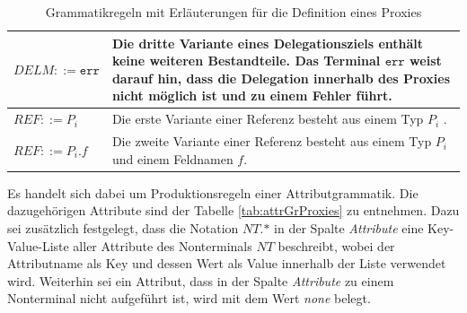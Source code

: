 \documentclass[a4paper,12pt]{article}
\begin{document}
\begin{table}[H]
\begin{tabular}{|p{5cm}|p{9cm}|}
\hline
$\mathit{DELM} ::= \texttt{err} $  
& Die dritte Variante eines Delegationsziels enthält keine weiteren Bestandteile. Das Terminal $\texttt{err}$ weist darauf hin, dass die Delegation innerhalb des Proxies nicht möglich ist und zu einem Fehler führt.\\
\hline
$\mathit{REF} ::= \mathit{P_i}$
& Die erste Variante einer Referenz besteht aus einem Typ $P_i$ .\\
\hline
$\mathit{REF} ::= \mathit{P_i}\texttt{.}\mathit{f}$
& Die zweite Variante einer Referenz besteht aus einem Typ $P_i$ und einem Feldnamen $f$.\\
\hline
\end{tabular}
\caption{Grammatikregeln mit Erläuterungen für die Definition eines Proxies}
 \label{tab:grProxies}
\end{table}
\noindent
Es handelt sich dabei um Produktionsregeln einer Attributgrammatik. Die dazugehörigen Attribute sind der Tabelle \ref{tab:attrGrProxies} zu entnehmen. Dazu sei zusätzlich festgelegt, dass die Notation $\mathit{NT}\texttt{.}\text{*}$ in der Spalte \emph{Attribute} eine Key-Value-Liste aller Attribute des Nonterminals $\mathit{NT}$ beschreibt, wobei der Attributname als Key und dessen Wert als Value innerhalb der Liste verwendet wird. Weiterhin sei ein Attribut, dass in der Spalte \emph{Attribute} zu einem Nonterminal nicht aufgeführt ist, wird mit dem Wert \emph{none} belegt.
\end{document}
